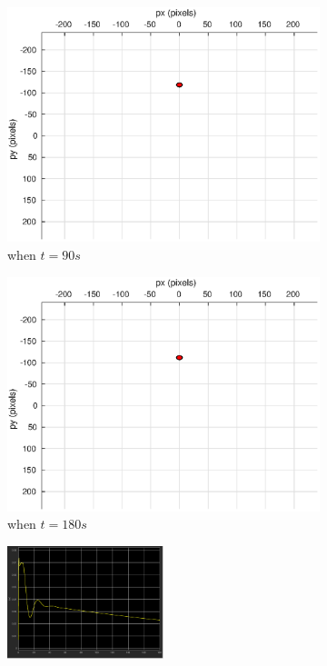 \begin{figure}[htbp]
\begin{subfigure}[t]{0.32\linewidth}
		\includegraphics[width=\textwidth]{images/chapter4/image_camera_5mps_90s}
		\caption{when $t=90s$}
	\end{subfigure}
	\begin{subfigure}[t]{0.32\linewidth}
		\includegraphics[width=\textwidth]{images/chapter4/image_camera_5mps_180s}
		\caption{when $t=180s$}
	\end{subfigure}	
	\begin{subfigure}[t]{0.8\linewidth}
		\centering
		\includegraphics[width=0.5\textwidth]{images/chapter4/image_Ex_5mps}

\end{subfigure}
\end{figure}
